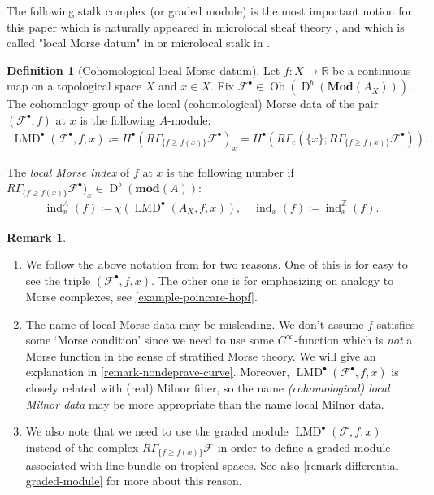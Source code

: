 \documentclass[a4paper,dvipdfmx,reqno,12pt]{amsart}
\theoremstyle{definition}
\newtheorem{definition}[theorem]{Definition}
\newtheorem{remark}[theorem]{Remark}
\newcommand{\deq}{\coloneqq}
\newcommand{\mcal}[1]{\mathcal{#1}}%
\newcommand{\opn}[1]{\operatorname{#1}}
\newcommand{\catn}[1]{\mathbf{#1}}
\numberwithin{equation}{section}
\begin{document}
The following stalk complex (or graded module) is 
the most important notion
for this paper which is naturally appeared in
microlocal sheaf theory \cite{MR1299726}, 
and which is called "local Morse datum" in \cite[p.271]{MR2031639} 
or microlocal stalk in \cite{MR4132582}.
\begin{definition}[{Cohomological local Morse datum}]
\label{definition-local-morse-data}
Let $f\colon X\to {\mathbb{R}}$ be a continuous map on a 
topological space $X$ and $x\in X$. Fix 
$\mathcal{F}^{\bullet}\in 
\opn{Ob}(\opn{D}^{b}(\catn{Mod}(A_X)))$.
The cohomology group of the local (cohomological) Morse 
data of the pair $(\mathcal{F}^{\bullet},f)$ at $x$ 
is the following $A$-module: 
\begin{align}
\opn{LMD}^{\bullet}(\mcal{F}^{\bullet},f,x)\deq 
H^{\bullet}(R\Gamma_{\{f\geq f(x)\}}\mathcal{F}^{\bullet})_x
=H^{\bullet}(R\Gamma_c(\{x\};R\Gamma_{\{f\geq f(x)\}}
\mathcal{F}^{\bullet})).
\end{align}

The \emph{local Morse index} of $f$ at $x$ is the 
following number if 
$R\Gamma_{\{f\geq f(x)\}}\mathcal{F}^{\bullet})_x
\in \opn{D}^{b}(\catn{mod}(A))$:
\begin{align} \label{equation-local-index}
\opn{ind}_x^{A}(f)\deq \chi(\opn{LMD}^{\bullet}(A_X,f,x)), \quad
\opn{ind}_x(f) \deq \opn{ind}_x^{\mathbb{Z}}(f).
\end{align}

\end{definition}

\begin{remark}
\begin{enumerate}
\item We follow the above notation from 
\cite[p.271]{MR2031639} for two reasons.
One of this is for easy to see the triple 
$(\mcal{F}^{\bullet},f,x)$. 
The other one is for emphasizing on analogy to
Morse complexes, see \cref{example-poincare-hopf}.
\item The name of local Morse data may be misleading.
We don't assume $f$ satisfies some 
`Morse condition' since
 we need to use some $C^{\infty}$-function
which is \emph{not} a Morse function in the sense of 
stratified Morse theory. 
We will give an explanation in 
\cref{remark-nondeprave-curve}.
Moreover, 
$\opn{LMD}^{\bullet}(\mathcal{F}^{\bullet},f,x)$
is closely related with (real) Milnor fiber, so
the name \emph{(cohomological) local Milnor data} may 
be more appropriate 
than the name local Milnor data. 
\item We also note that we need to use 
the graded module $\opn{LMD}^{\bullet}(\mcal{F},f,x)$ instead of 
the complex $R\Gamma_{\{f\geq f(x)\}}\mathcal{F}$ in order to define
a graded module associated with line bundle on tropical
spaces. See also \cref{remark-differential-graded-module} for more about 
this reason.
\end{enumerate}
\end{remark}
\end{document}

